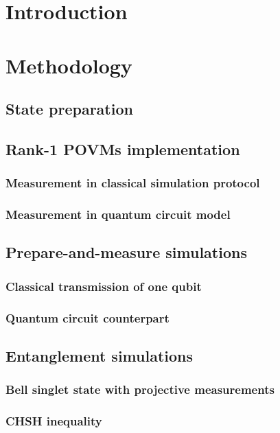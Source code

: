 \documentclass{article}
\begin{document}

\newpage

\newpage
\tableofcontents

\newpage
\section{Introduction}


\newpage
\section{Methodology}
\subsection{State preparation}

\subsection{Rank-1 POVMs implementation}
\subsubsection{Measurement in classical simulation protocol}
\subsubsection{Measurement in quantum circuit model}
\subsection{Prepare-and-measure simulations}
\subsubsection{Classical transmission of one qubit}
\subsubsection{Quantum circuit counterpart}

\subsection{Entanglement simulations}
\subsubsection{Bell singlet state with projective measurements}
\subsubsection{CHSH inequality}
\end{document}
